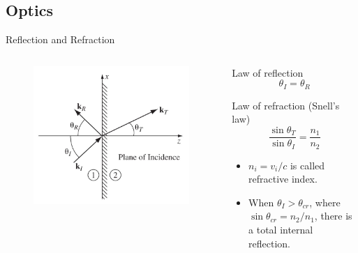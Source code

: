 \documentclass{beamer}
\begin{document}
\subsection{Optics}

\begin{frame}{Reflection and Refraction}
    \begin{columns}
        \begin{column}{.3\linewidth}
            \begin{figure}[htbp]
                \centering
                \includegraphics[width=\textwidth]{Images/re.jpg}
            \end{figure}
        \end{column}
        \begin{column}{.7\linewidth}
            \begin{block}{Law of reflection}
                \begin{equation}
                    \theta_I = \theta_R
                \end{equation}
            \end{block}

            \begin{block}{Law of refraction (Snell's law)}
                \begin{equation}
                    \frac{\sin \theta_T}{\sin \theta_I} = \frac{n_1}{n_2}
                \end{equation}
            \end{block}
            \begin{itemize}
                \item $n_i = v_i / c$ is called refractive index.
                \item When $\theta_I > \theta_{cr}$, where $\sin \theta_{cr} = n_2 / n_1$, there is a total internal reflection.
            \end{itemize}
        \end{column}
    \end{columns}
\end{frame}
\end{document}
